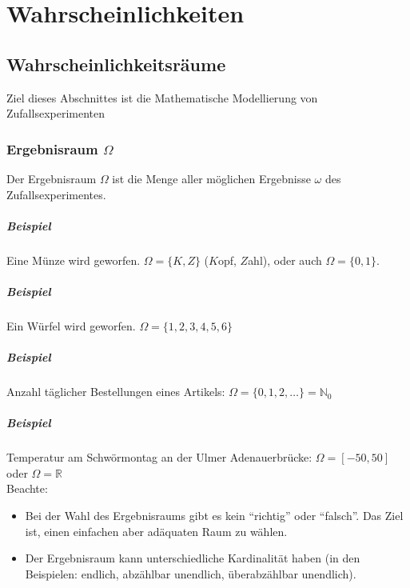 \chapter{Wahrscheinlichkeiten}
\section{Wahrscheinlichkeitsräume}
Ziel dieses Abschnittes ist die Mathematische Modellierung von Zufallsexperimenten

\subsection{Ergebnisraum $\Omega$}
Der Ergebnisraum $\Omega$ ist die Menge aller möglichen Ergebnisse $\omega$ des
Zufallsexperimentes.

\paragraph{Beispiel} Eine Münze wird geworfen. $\Omega = \{K, Z\}$ ($K$opf, $Z$ahl), oder auch
$\Omega = \{0, 1\}$.

\paragraph{Beispiel} Ein Würfel wird geworfen. $\Omega = \{1,2,3,4,5,6\}$

\paragraph{Beispiel} Anzahl täglicher Bestellungen eines Artikels:
$\Omega = \{0,1,2,\dots\} = \mathbb{N}_0$

\paragraph{Beispiel} Temperatur am Schwörmontag an der Ulmer Adenauerbrücke:
$\Omega = [-50,50]$ oder $\Omega = \mathbb{R}$
\\

Beachte:
\begin{itemize}
    \item Bei der Wahl des Ergebnisraums gibt es kein \enquote{richtig} oder \enquote{falsch}.
          Das Ziel ist, einen einfachen aber adäquaten Raum zu wählen.
      \item Der Ergebnisraum kann unterschiedliche Kardinalität haben
            (in den Beispielen: endlich, abzählbar unendlich, überabzählbar unendlich).
\end{itemize}

